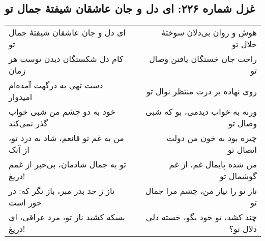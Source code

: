 \begin{center}
\section*{غزل شماره ۲۲۶: ای دل و جان عاشقان شیفتهٔ جمال تو}
\label{sec:226}
\begin{longtable}{l p{0.5cm} r}
ای دل و جان عاشقان شیفتهٔ جمال تو
&&
هوش و روان بی‌دلان سوختهٔ جلال تو
\\
کام دل شکستگان دیدن توست هر زمان
&&
راحت جان خستگان یافتن وصال تو
\\
دست تهی به درگهت آمده‌ام امیدوار
&&
روی نهاده بر درت منتظر نوال تو
\\
خود به دو چشم من شبی خواب گذر نمی‌کند
&&
ورنه به خواب دیدمی، بو که شبی وصال تو
\\
من به غم تو قانعم، شاد به درد تو، از آنک
&&
چیره بود به خون من دولت اتصال تو
\\
تو به جمال شادمان، بی‌خبر از غمم دریغ!
&&
من شده پایمال غم، از غم گوشمال تو
\\
ناز ز حد بدر مبر، باز نگر که: در خور است
&&
ناز تو را نیاز من، چشم مرا جمال تو
\\
بسکه کشید ناز تو، مرد عراقی، ای دریغ!
&&
چند کشد، تو خود بگو، خسته دلی دلال تو؟
\\
\end{longtable}
\end{center}
